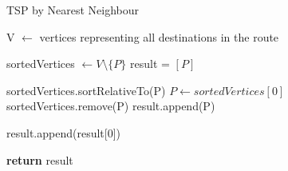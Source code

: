 \documentclass{article}
\begin{document}
\begin{algorithm}[h]
\caption{TSP by Nearest Neighbour}
\begin{algorithmic}[1]

\State V $\gets$ vertices representing all destinations in the route


\State sortedVertices $\gets V \setminus \{P\}$
\State result = $[P]$

	\State sortedVertices.sortRelativeTo(P)
	\State $P \gets sortedVertices[0]$
	\State sortedVertices.remove(P)
	\State result.append(P)
\EndWhile

\State result.append(result[0])

\State \textbf{return} result
\EndProcedure

\end{algorithmic}
\end{algorithm}
\end{document}
